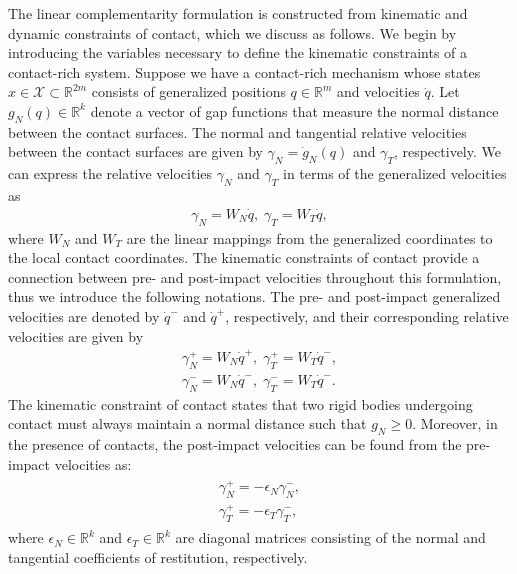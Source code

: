 {\color{red}
%
The linear complementarity formulation is constructed from kinematic and dynamic
constraints of contact, which we discuss as follows.
%
We begin by introducing the variables necessary to define the kinematic
constraints of a contact-rich system.
%
Suppose we have a contact-rich mechanism whose states $x \in \mathcal{X} \subset
\mathbb{R}^{2m}$ consists of generalized positions $q \in \mathbb{R}^m$ and
velocities $\dot{q}$.
%
Let $g_N(q) \in \mathbb{R}^{k}$ denote a vector of gap functions that measure
the normal distance between the contact surfaces. 
%
The normal and tangential relative velocities between the contact surfaces are
given by $\gamma_N = \dot{g}_N(q)$ and $\gamma_T$, respectively.
%
We can express the relative velocities $\gamma_N$ and $\gamma_T$ in terms of the
generalized velocities as 
%
\begin{align*}
  \gamma_N = W_N \dot{q}, \; \gamma_T = W_T \dot{q},
\end{align*}  
\noindent where $W_N$ and $W_T$ are the linear mappings from the generalized
coordinates to the local contact coordinates.
%
The kinematic constraints of contact provide a connection between pre- and
post-impact velocities throughout this formulation, thus we introduce the
following notations.
%
The pre- and post-impact generalized velocities are denoted by $\dot{q}^-$ and
$\dot{q}^+$, respectively, and their corresponding relative velocities are given
by
\begin{align*}
  \gamma_N^+ = W_N\dot{q}^+, \; \gamma_T^+ = W_T\dot{q}^-, \\
  \gamma_N^- = W_N\dot{q}^-, \; \gamma_T^- = W_T\dot{q}^-.
\end{align*}
%
The kinematic constraint of contact states that two rigid bodies undergoing
contact must always maintain a normal distance such that $g_N \geq 0$. Moreover,
in the presence of contacts, the post-impact velocities can be found from the
pre-impact velocities as:
\begin{align}
  \begin{gathered}
    \gamma_N^+ = -\epsilon_N \gamma_N^-, \\
    \gamma_T^+ = -\epsilon_T \gamma_T^-,
  \end{gathered}
  \label{eq:postimpactVel}
\end{align}
\noindent where $\epsilon_N \in \mathbb{R}^k$ and $\epsilon_T \in \mathbb{R}^k$
are diagonal matrices consisting of the normal and tangential coefficients of
restitution, respectively.

}
